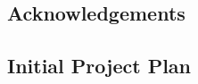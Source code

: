 \documentclass[a4paper]{report}
\begin{document}
\section{Acknowledgements}





\begin{appendices}

\chapter{Initial Project Plan}


    
\end{appendices}
\end{document}
